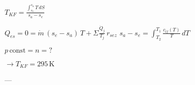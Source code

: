 \( T_{KF} = \frac{\int_{s_e}^{s_a} T \, dS}{s_a - s_e} \)  

\( Q_{es} = 0 = \dot{m} \, (s_e - s_a) \, T + \Sigma \frac{\dot{Q}_j}{T_j} \, r_{sez} \)  
\( s_a - s_e = \int_{T_2}^{T_1} \frac{c_{lf}(T)}{T} \, dT \)  

\( p \, \text{const} = n = \text{?} \)  

\( \rightarrow T_{KF} = 295 \, \text{K} \)  

---